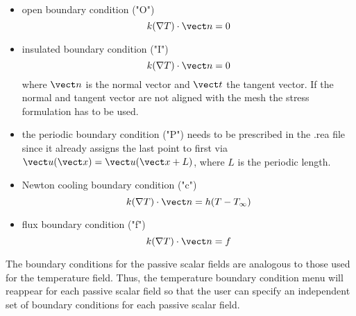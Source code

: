 \paragraph*{}
\begin{itemize}
\item open boundary condition ("O")
\begin{equation}
k(\nabla T)\cdot \vect n=0
\end{equation}
\item insulated boundary condition ("I")
\begin{equation}
k(\nabla T)\cdot \vect n=0
\end{equation}
where \(\vect n\) is the normal vector and \(\vect t\) the tangent vector. If the normal and tangent vector are not aligned with the mesh the stress formulation has to be used.

\item the periodic boundary condition ("P") needs to be prescribed in the .rea file since it already assigns the last point to first via \(\vect u(\vect x)=\vect u(\vect x + L) \), where \(L\) is the periodic length.

\item Newton cooling boundary condition ("c")
\begin{equation}
k(\nabla T)\cdot \vect n=h(T-T_{\infty})
\end{equation}
\item flux boundary condition ("f")
\begin{equation}
k(\nabla T)\cdot \vect n=f
\end{equation}
\end{itemize}

The boundary conditions for the passive scalar fields
are analogous to those used for the temperature field.
Thus, the temperature boundary condition
menu will reappear for each passive scalar field so that the
user can specify an independent set of boundary conditions
for each passive scalar field. 
